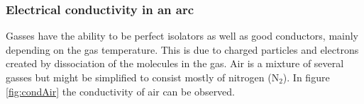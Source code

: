\documentclass[10pt,a4paper,twoside]{article}
\begin{document}

\subsubsection{Electrical conductivity in an arc} \label{sec:eleCondArc}
Gasses have the ability to be perfect isolators as well as good conductors, mainly depending on the gas temperature. This is due to charged particles and electrons created by dissociation of the molecules in the gas. Air is a mixture of several gasses but might be simplified to consist mostly of nitrogen (N$_2$). In figure \ref{fig:condAir} the conductivity of air can be observed.   
\end{document}
